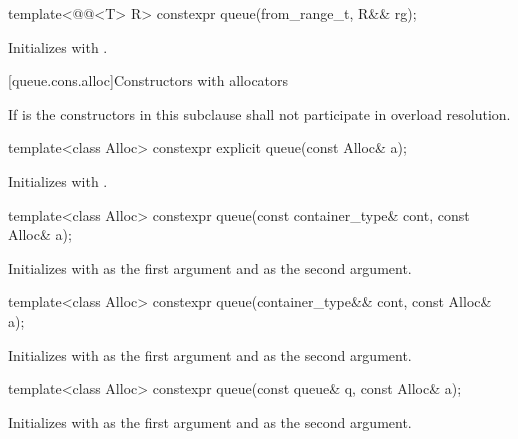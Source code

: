 %
\begin{itemdecl}
template<@@<T> R>
  constexpr queue(from_range_t, R&& rg);
\end{itemdecl}

\begin{itemdescr}
\pnum
\effects
Initializes  with .
\end{itemdescr}

[queue.cons.alloc]{Constructors with allocators}

\pnum
If  is 
the constructors in this subclause shall not participate in overload resolution.

%
\begin{itemdecl}
template<class Alloc> constexpr explicit queue(const Alloc& a);
\end{itemdecl}

\begin{itemdescr}
\pnum
\effects
Initializes  with .
\end{itemdescr}

%
\begin{itemdecl}
template<class Alloc> constexpr queue(const container_type& cont, const Alloc& a);
\end{itemdecl}

\begin{itemdescr}
\pnum
\effects
Initializes  with  as the first argument and 
as the second argument.
\end{itemdescr}

%
\begin{itemdecl}
template<class Alloc> constexpr queue(container_type&& cont, const Alloc& a);
\end{itemdecl}

\begin{itemdescr}
\pnum
\effects
Initializes  with  as the first argument and 
as the second argument.
\end{itemdescr}

%
\begin{itemdecl}
template<class Alloc> constexpr queue(const queue& q, const Alloc& a);
\end{itemdecl}

\begin{itemdescr}
\pnum
\effects
Initializes  with  as the first argument and  as the
second argument.
\end{itemdescr}

